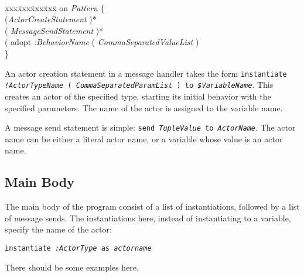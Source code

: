 \documentclass[11pt]{article}
\begin{document}
{\tt
\begin{tabbing}
xxx\=xxx\=xxx\=xxx\=\kill
on {\em Pattern} \{ \\
\> ({\em ActorCreateStatement} )* \\
\> ( {\em MessageSendStatement} )* \\
\> ( adopt {\em :BehaviorName} ( {\em CommaSeparatedValueList} ) \\
\}
\end{tabbing}}

An actor creation statement in a message handler takes the form {\tt instantiate {\em !ActorTypeName} ( {\em CommaSeparatedParamList} ) to {\em \$VariableName}}. This creates an actor of the specified type, starting its initial behavior with the specified parameters. The name of the actor is assigned to
the variable name.

A message send statement is simple: {\tt send {\em TupleValue} to {\em ActorName}}. The actor name can be either a literal actor name, or a variable whose value is an actor name.


\subsection{Main Body}

The main body of the program consist of a list of instantiations,
followed by a list of message sends. The instantiations here, instead of instantiating to a variable, specify the name of the actor:

{\tt instantiate {\em :ActorType} as {\em actorname}}

There should be some examples here.
\end{document}

